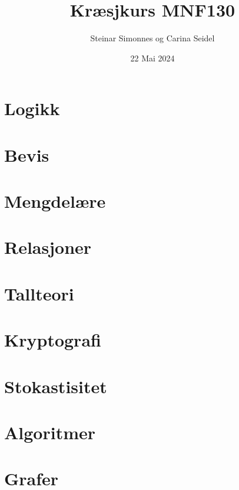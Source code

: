 \documentclass[aspectratio=169,fleqn,handout,xcolor={dvipsnames}]{beamer}
\author[ls]{Steinar Simonnes og Carina Seidel}
\title[sgp]{Kræsjkurs MNF130}
\institute{Institutt for Informatikk \\ Universitetet i Bergen}
\date[22.05.24]{22 Mai 2024}
\begin{document}


\section{Logikk}




\section{Bevis}




\section{Mengdelære}


% 


\section{Relasjoner}






\section{Tallteori}





\section{Kryptografi}




\section{Stokastisitet}




\section{Algoritmer}




\section{Grafer}







\end{document}
